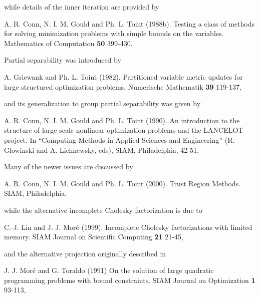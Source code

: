 \documentclass{galahad}
\begin{document}
\noindent
while details of the inner iteration are provided by

\noindent
A. R. Conn, N. I. M. Gould and Ph. L. Toint (1988b).
Testing a class of methods for solving minimization
problems with simple bounds on the variables.
Mathematics of Computation {\bf 50} 399-430.

Partial separability was introduced by

\noindent
A. Griewank and Ph. L. Toint (1982).
Partitioned variable metric updates for large structured
optimization problems.
Numerische Mathematik {\bf 39} 119-137,

\noindent
and its generalization to group partial separability was given by

\noindent
A. R. Conn, N. I. M. Gould and Ph. L. Toint (1990).
An introduction to the structure of large scale nonlinear
optimization problems and the {{\sf LANCELOT}} project.
In ``Computing Methods in Applied Sciences and Engineering''
(R. Glowinski and A. Lichnewsky, eds), SIAM, Philadelphia, 42-51.

Many of the newer issues are discussed by

\noindent
A. R. Conn, N. I. M. Gould and Ph. L. Toint (2000).
Trust Region Methods.
SIAM, Philadelphia,

\noindent
while the alternative incomplete Cholesky factorization is
due to

\noindent
C.-J. Lin and J. J. Mor\'{e} (1999).
Incomplete Cholesky factorizations with limited memory.
SIAM Journal on Scientific Computing {\bf 21} 21-45,

\noindent
and the alternative projection originally described in

\noindent
J. J. Mor\'{e} and G. Toraldo (1991)
On the solution of large quadratic programming problems
with bound constraints.
SIAM Journal on Optimization {\bf 1} 93-113,
\end{document}
